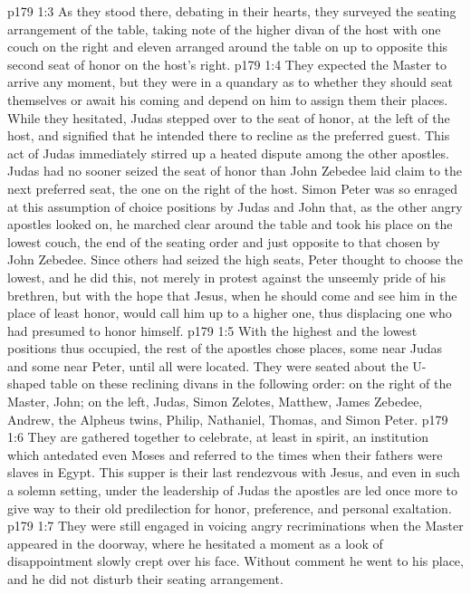 \vs p179 1:3 As they stood there, debating in their hearts, they surveyed the seating arrangement of the table, taking note of the higher divan of the host with one couch on the right and eleven arranged around the table on up to opposite this second seat of honor on the host’s right.
\vs p179 1:4 They expected the Master to arrive any moment, but they were in a quandary as to whether they should seat themselves or await his coming and depend on him to assign them their places. While they hesitated, Judas stepped over to the seat of honor, at the left of the host, and signified that he intended there to recline as the preferred guest. This act of Judas immediately stirred up a heated dispute among the other apostles. Judas had no sooner seized the seat of honor than John Zebedee laid claim to the next preferred seat, the one on the right of the host. Simon Peter was so enraged at this assumption of choice positions by Judas and John that, as the other angry apostles looked on, he marched clear around the table and took his place on the lowest couch, the end of the seating order and just opposite to that chosen by John Zebedee. Since others had seized the high seats, Peter thought to choose the lowest, and he did this, not merely in protest against the unseemly pride of his brethren, but with the hope that Jesus, when he should come and see him in the place of least honor, would call him up to a higher one, thus displacing one who had presumed to honor himself.
\vs p179 1:5 With the highest and the lowest positions thus occupied, the rest of the apostles chose places, some near Judas and some near Peter, until all were located. They were seated about the U\hyp{}shaped table on these reclining divans in the following order: on the right of the Master, John; on the left, Judas, Simon Zelotes, Matthew, James Zebedee, Andrew, the Alpheus twins, Philip, Nathaniel, Thomas, and Simon Peter.\plusone
\pc \vs p179 1:6 They are gathered together to celebrate, at least in spirit, an institution which antedated even Moses and referred to the times when their fathers were slaves in Egypt. This supper is their last rendezvous with Jesus, and even in such a solemn setting, under the leadership of Judas the apostles are led once more to give way to their old predilection for honor, preference, and personal exaltation.
\pc \vs p179 1:7 They were still engaged in voicing angry recriminations when the Master appeared in the doorway, where he hesitated a moment as a look of disappointment slowly crept over his face. Without comment he went to his place, and he did not disturb their seating arrangement.
